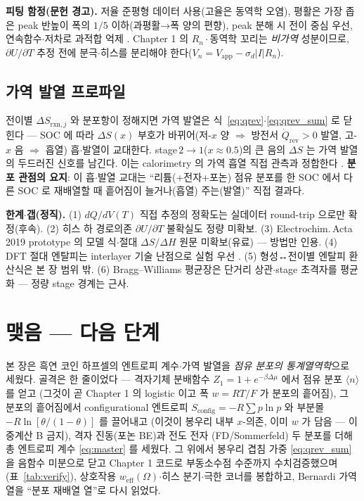 \documentclass[11pt,a4paper]{article}
\newcommand{\rxn}{\mathrm{rxn}}
\newcommand{\rev}{\mathrm{rev}}
\newcommand{\config}{\mathrm{config}}
\newcommand{\eff}{\mathrm{eff}}
\newcommand{\avg}[1]{\langle #1\rangle}
\begin{document}
\textbf{피팅 함정(문헌 경고).} 저율 준평형 데이터 사용(고율은 동역학 오염), 평활은 가장 좁은 peak
반높이 폭의 $1/5$ 이하(과평활→폭 양의 편향), peak 분해 시 전이 중심 우선, 연속함수$\cdot$저차로 과적합
억제 \cite{msmr_partI,msmr_partII}. Chapter 1 의 $R_n\cdot$동역학 꼬리는 \emph{비가역} 성분이므로,
$\partial U/\partial T$ 추정 전에 분극$\cdot$히스를 분리해야 한다($V_n=V_\mathrm{app}-\sigma_d|I|R_n$).

\subsection{가역 발열 프로파일}
전이별 $\Delta S_{\rxn,j}$ 와 분포항이 정해지면 가역 발열은 식~\eqref{eq:qrev}$\cdot$\eqref{eq:qrev_sum}
로 닫힌다 — SOC 에 따라 $\Delta S(x)$ 부호가 바뀌어(저-$x$ 양 $\Rightarrow$ 방전서 $\dot Q_\rev>0$ 발열,
고-$x$ 음 $\Rightarrow$ 흡열) 흡$\cdot$발열이 교대한다. stage\,$2\!\to\!1$($x\approx0.5$)의 큰 음의
$\Delta S$ 는 가역 발열의 두드러진 신호를 남긴다. 이는 calorimetry 의 가역 흡열 직접 관측과 정합한다
\cite{standardised2024}. \textbf{분포 관점의 요지}: 이 흡$\cdot$발열 교대는 ``리튬(+전자+포논) 점유
분포를 한 SOC 에서 다른 SOC 로 재배열할 때 흩어짐이 늘거나(흡열) 주는(발열)'' 직접 결과다.

\textbf{한계$\cdot$갭(정직).} (1) $dQ/dV(T)$ 직접 추정의 정확도는 실데이터 round-trip 으로만 확정(후속).
(2) 히스 하 경로의존 $\partial U/\partial T$ 불확실도 정량 미확보. (3) Electrochim.\,Acta 2019 prototype
의 모델 식$\cdot$절대 $\Delta S/\Delta H$ 원문 미확보(유료) — 방법만 인용. (4) DFT 절대 엔탈피는
interlayer 기술 난점으로 실험 우선 \cite{jpcc2021}. (5) 형성↔전이별 엔탈피 환산식은 본 장 범위 밖.
(6) Bragg--Williams 평균장은 단거리 상관$\cdot$stage 초격자를 평균화 — 정량 stage 경계는 근사.

\section*{맺음 — 다음 단계}
본 장은 흑연 코인 하프셀의 엔트로피 계수$\cdot$가역 발열을 \emph{점유 분포의 통계열역학}으로 세웠다.
골격은 한 줄이었다 — 격자기체 분배함수 $Z_1=1+e^{-\beta\Delta\mu}$ 에서 점유 분포 $\avg{n}$ 를 얻고
(그것이 곧 Chapter 1 의 logistic 이고 폭 $w=RT/F$ 가 분포의 흩어짐), 그 분포의 흩어짐에서
configurational 엔트로피 $S_\config=-R\sum p\ln p$ 와 부분몰 $-R\ln[\theta/(1-\theta)]$ 를 끌어내고
(이것이 봉우리 내부 $x$-의존, 이미 $w$ 가 담음 — 이중계산 B 금지), 격자 진동(포논 BE)과 전도 전자
(FD/Sommerfeld) 두 분포를 더해 총 엔트로피 계수 \eqref{eq:master} 를 세웠다. 그 위에서 봉우리 겹침
가중 \eqref{eq:qrev_sum} 을 음함수 미분으로 닫고 Chapter 1 코드로 부동소수점 수준까지 수치검증했으며
(표~\ref{tab:verify}), 상호작용 $w_\eff(\Omega)$$\cdot$히스 분기$\cdot$극한 코너를 봉합하고, Bernardi
가역열을 ``분포 재배열 열''로 다시 읽었다.
\end{document}
